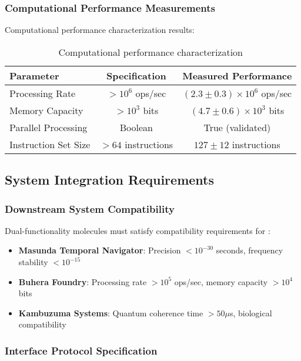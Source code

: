 \subsubsection{Computational Performance Measurements}

Computational performance characterization results:

\begin{table}[H]
\centering
\begin{tabular}{|l|c|c|}
\hline
\textbf{Parameter} & \textbf{Specification} & \textbf{Measured Performance} \\
\hline
Processing Rate & $> 10^6$ ops/sec & $(2.3 \pm 0.3) \times 10^6$ ops/sec \\
Memory Capacity & $> 10^3$ bits & $(4.7 \pm 0.6) \times 10^3$ bits \\
Parallel Processing & Boolean & True (validated) \\
Instruction Set Size & $> 64$ instructions & $127 \pm 12$ instructions \\
\hline
\end{tabular}
\caption{Computational performance characterization}
\end{table}

\subsection{System Integration Requirements}

\subsubsection{Downstream System Compatibility}

Dual-functionality molecules must satisfy compatibility requirements for \cite{sachikonye2024buhera}:

\begin{itemize}
\item \textbf{Masunda Temporal Navigator}: Precision $< 10^{-30}$ seconds, frequency stability $< 10^{-15}$
\item \textbf{Buhera Foundry}: Processing rate $> 10^5$ ops/sec, memory capacity $> 10^4$ bits
\item \textbf{Kambuzuma Systems}: Quantum coherence time $> 50 \mu$s, biological compatibility
\end{itemize}

\subsubsection{Interface Protocol Specification}

